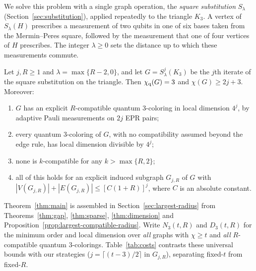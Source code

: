 We solve this problem with a single graph operation, the \emph{square substitution} $S_\lambda$ (Section~\ref{sec:substitution}), applied repeatedly to the triangle $K_3$. A vertex of $S_\lambda(H)$ prescribes a measurement of two qubits in one of six bases taken from the Mermin--Peres square, followed by the measurement that one of four vertices of $H$ prescribes. The integer $\lambda\ge0$ sets the distance up to which these measurements commute.

\begin{theorem}\label{thm:main}
Let $j,R\ge1$ and $\lambda=\max\{R-2,0\}$, and let $G=S^j_\lambda(K_3)$ be the $j$th iterate of the square substitution on the triangle. Then $\chi_{\mathrm q}(G)=3$ and $\chi(G)\ge2j+3$. Moreover:
\begin{enumerate}
\setlength{\itemsep}{3pt}\setlength{\topsep}{4pt}\setlength{\parsep}{0pt}
\item[\textup{(i)}] $G$ has an explicit $R$-compatible quantum $3$-coloring in local dimension $4^j$, by adaptive Pauli measurements on $2j$ EPR pairs;
\item[\textup{(ii)}] every quantum $3$-coloring of $G$, with no compatibility assumed beyond the edge rule, has local dimension divisible by $4^j$;
\item[\textup{(iii)}] none is $k$-compatible for any $k>\max\{R,2\}$;
\item[\textup{(iv)}] all of this holds for an explicit induced subgraph $G_{j,R}$ of $G$ with $|V(G_{j,R})|+|E(G_{j,R})|\le[C(1+R)]^j$, where $C$ is an absolute constant.
\end{enumerate}
\end{theorem}

Theorem~\ref{thm:main} is assembled in Section~\ref{sec:largest-radius} from Theorems~\ref{thm:gap}, \ref{thm:sparse}, \ref{thm:dimension} and Proposition~\ref{prop:largest-compatible-radius}. Write $N_3(t,R)$ and $D_3(t,R)$ for the minimum order and local dimension over \emph{all} graphs with $\chi\ge t$ and \emph{all} $R$-compatible quantum $3$-colorings. Table~\ref{tab:costs} contrasts these universal bounds with our strategies ($j=\lceil(t-3)/2\rceil$ in $G_{j,R}$), separating fixed-$t$ from fixed-$R$.

